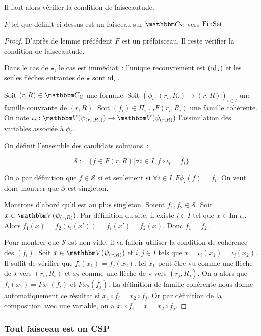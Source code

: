 Il faut alors vérifier la condition de faisceautude.

\begin{lem}
    $F$ tel que définit ci-dessus est un faisceau sur $\C_\Sigma$ vers $\text{FinSet}$.
\end{lem}

\begin{proof}
    D'après de lemme précédent $F$ est un préfaisceau. Il reste vérifier la condition
    de faisceautude.

    Dans le cas de $\star$, le cas est immédiat~: l'unique recouvrement est $(\operatorname{id}_\star)$
    et les seules flèches entrantes de $\star$ sont $\operatorname{id}_\star$.

    Soit $(r,R)\in\C_\Sigma$ une formule. Soit
    $(\phi_i : (r_i, R_i)\rightarrow (r,R))_{i\in I}$ une famille couvrante de $(r,R)$.
    Soit $(f_i)\in\Pi_{i\in I} F(r_i,R_i)$ une famille cohérente. On note
    $\iota_i : \V(\psi_{(r_i,R_i)})\rightarrow\V(\psi_{(r,R)})$ l'assimilation des
    variables associée à $\phi_i$.

    On définit l'ensemble des candidats solutions~:

    \[\mathscr{S} := \{ f\in F(r,R) | \forall i\in I, f \circ\iota_i = f_i \} \]

    On a par définition que $f\in\mathscr{S}$ si et seulement si
    $\forall i\in I, F\phi_i(f) = f_i$. On veut donc montrer que $\mathscr{S}$
    est singleton.

    Montrons d'abord qu'il est au plus singleton. Soient $f_1, f_2\in\mathscr{S}$. Soit
    $x\in\V(\psi_{(r,R)})$. Par définition du site, il existe $i\in I$ tel que
    $x\in \text{Im }\iota_i$. Alors $f_1(x) = f_2(\iota_i(x')) = f_i(x') = f_2(x)$.
    Donc $f_1 = f_2$.

    Pour montrer que $\mathscr{S}$ est non vide, il va falloir utiliser la condition de
    cohérence des $(f_i)$. Soit $x\in\V(\psi_{(r,R)})$ et $i,j\in I$ tels que
    $x = \iota_i(x_1) = \iota_j(x_2)$. Il suffit de vérifier que $f_i(x_1) = f_j(x_2)$.
    Ici $x_1$ peut être vu comme une flèche de $\star$ vers $(r_i,R_i)$ et $x_2$ comme
    une flèche de $\star$ vers $(r_j,R_j)$. On a alors que 
    $f_i(x_1) = Fx_1(f_i)$ et $Fx_2(f_j)$. La définition de famille cohérente nous donne
    automatiquement ce résultat si $x_1\circ f_i = x_2\circ f_j$. Or par définition de la
    composition avec une variable, on a $x_1\circ f_i = x = x_2\circ f_j$.
\end{proof}

\subsubsection{Tout faisceau est un CSP}


